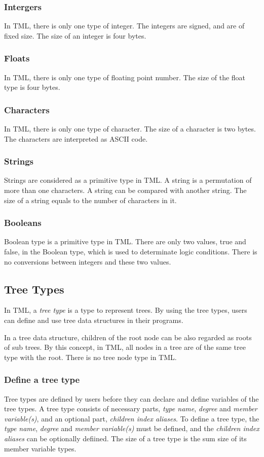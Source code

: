 \documentclass[12pt,psfig,a4]{article}
\begin{document}
\subsubsection {Intergers}
In TML, there is only one type of integer. The integers are signed, and are of fixed size. The size of an integer is four bytes.

\subsubsection {Floats}
In TML, there is only one type of floating point number. The size of the float type is four bytes.

\subsubsection {Characters}
In TML, there is only one type of character. The size of a character is two bytes. The characters are interpreted as ASCII code.

\subsubsection {Strings}
Strings are considered as a primitive type in TML. A string is a permutation of more than one characters. A string can be compared with another string. The size of a string equals to the number of characters in it.

\subsubsection {Booleans}
Boolean type is a primitive type in TML. There are only two values, true and false, in the Boolean type, which is used to determinate logic conditions. There is no conversions between integers and these two values.

\subsection {Tree Types}
In TML, a \textit{tree type} is a type to represent trees. By using the tree types, users can define and use tree data structures in their programs.

In a tree data structure, children of the root node can be also regarded as roots of sub trees. By this concept, in TML, all nodes in a tree are of the same tree type with the root. There is no tree node type in TML.

\subsubsection {Define a tree type}
Tree types are defined by users before they can declare and define variables of the tree types. A tree type consists of necessary parts, \textit{type name}, \textit{degree} and \textit{member variable(s)}, and an optional part, \textit{children index aliases}. To define a tree type, the \textit{type name}, \textit{degree} and \textit{member variable(s)} must be defined, and the \textit{children index aliases} can be optionally defiined. The size of a tree type is the sum size of its member variable types.
\end{document}
